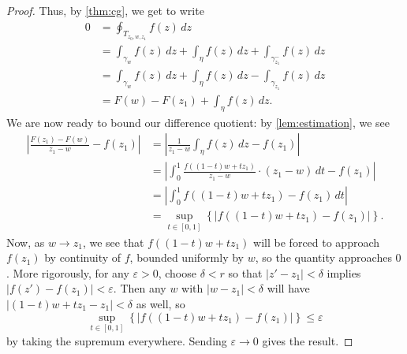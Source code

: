 \documentclass[../notes.tex]{subfiles}
\begin{document}
\begin{proof}
	Thus, by \autoref{thm:cg}, we get to write
	\begin{align*}
		0 &= \oint_{T_{z_0,w,z_1}}f(z)\,dz \\
		&= \int_{\gamma_w}f(z)\,dz+\int_\eta f(z)\,dz+\int_{\gamma_{z_1}^-}f(z)\,dz \\
		&= \int_{\gamma_w}f(z)\,dz+\int_\eta f(z)\,dz-\int_{\gamma_{z_1}}f(z)\,dz \\
		&= F(w)-F(z_1)+\int_\eta f(z)\,dz.
	\end{align*}
	We are now ready to bound our difference quotient: by \autoref{lem:estimation}, we see
	\begin{align*}
		\left|\frac{F(z_1)-F(w)}{z_1-w}-f(z_1)\right| &= \left|\frac1{z_1-w}\int_\eta f(z)\,dz-f(z_1)\right| \\
		&= \left|\int_0^1\frac{f((1-t)w+tz_1)}{z_1-w}\cdot(z_1-w)\,dt-f(z_1)\right| \\
		&= \left|\int_0^1f((1-t)w+tz_1)-f(z_1)\,dt\right| \\
		&= \sup_{t\in[0,1]}\left\{\big|f((1-t)w+tz_1)-f(z_1)\big|\right\}.
	\end{align*}
	Now, as $w\to z_1$, we see that $f((1-t)w+tz_1)$ will be forced to approach $f(z_1)$ by continuity of $f$, bounded uniformly by $w$, so the quantity approaches $0$. More rigorously, for any $\varepsilon>0$, choose $\delta<r$ so that $|z'-z_1|<\delta$ implies $|f(z')-f(z_1)|<\varepsilon$. Then any $w$ with $|w-z_1|<\delta$ will have $|(1-t)w+tz_1-z_1|<\delta$ as well, so
	\[\sup_{t\in[0,1]}\left\{\big|f((1-t)w+tz_1)-f(z_1)\big|\right\}\le\varepsilon\]
	by taking the supremum everywhere. Sending $\varepsilon\to0$ gives the result.
\end{proof}
\end{document}
